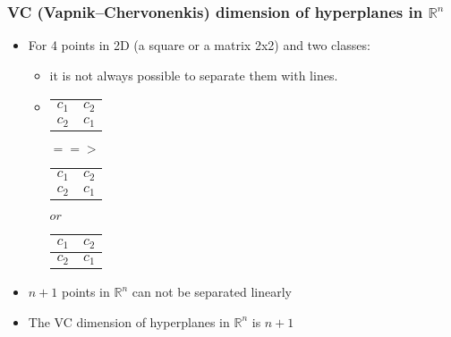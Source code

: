 \documentclass[proffesionalfonts]{beamer}
\begin{document}
\begin{frame}
\frametitle{VC (Vapnik–Chervonenkis) dimension of hyperplanes in $\mathbb R^n$}
  \begin{itemize}
  \item For 4 points in 2D (a square or a matrix 2x2) and two classes:
    \begin{itemize}
    \item it is not always possible to separate them with lines. 
	\item[\ ]
	\begin{tabular}{cc}
	$c_1$ & $c_2$ \\
	$c_2$ & $c_1$ \\
	\end{tabular}
	$==>$
	\begin{tabular}{c|c}
	$c_1$ & $c_2$ \\
	$c_2$ & $c_1$ \\
	\end{tabular}
	$or$
	\begin{tabular}{cc}
	$c_1$ & $c_2$ \\
	\hline
	$c_2$ & $c_1$ \\
	\end{tabular}
    \end{itemize}
  \item $n+1$ points in  $\mathbb R^n$ can not be separated linearly
  \item The VC dimension of hyperplanes in $\mathbb R^n$ is $n + 1$
  \end{itemize}
\end{frame}
\end{document}
